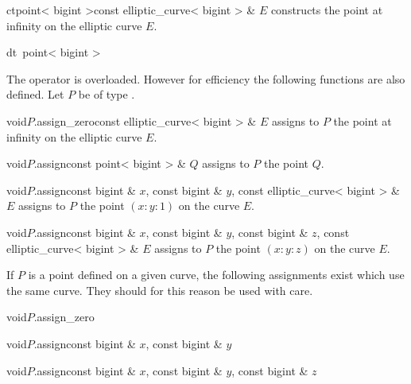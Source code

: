 \begin{fcode}{ct}{point< bigint >}{const elliptic_curve< bigint > & $E$}
  constructs the point at infinity on the elliptic curve $E$.
\end{fcode}

\begin{fcode}{dt}{~point< bigint >}{}
\end{fcode}



\ASGN

The operator \code{=} is overloaded.  However for efficiency the following functions are also
defined.  Let $P$ be of type .

\begin{fcode}{void}{$P$.assign_zero}{const elliptic_curve< bigint > & $E$}
  assigns to $P$ the point at infinity on the elliptic curve $E$.
\end{fcode}

\begin{fcode}{void}{$P$.assign}{const point< bigint > & $Q$}
  assigns to $P$ the point $Q$.
\end{fcode}

\begin{fcode}{void}{$P$.assign}{const bigint & $x$, const bigint & $y$,
    const elliptic_curve< bigint > & $E$}%
  assigns to $P$ the point $(x:y:1)$ on the curve $E$.
\end{fcode}

\begin{fcode}{void}{$P$.assign}{const bigint & $x$, const bigint & $y$,
    const bigint & $z$, const elliptic_curve< bigint > & $E$}%
  assigns to $P$ the point $(x:y:z)$ on the curve $E$.
\end{fcode}

If $P$ is a point defined on a given curve, the following assignments exist which use the same
curve.  They should for this reason be used with care.

\begin{fcode}{void}{$P$.assign_zero}{}
\end{fcode}

\begin{fcode}{void}{$P$.assign}{const bigint & $x$, const bigint & $y$}
\end{fcode}

\begin{fcode}{void}{$P$.assign}{const bigint & $x$, const bigint & $y$, const bigint & $z$}
\end{fcode}

